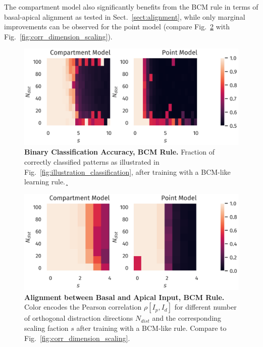 \documentclass[10pt,a4paper,twocolumn]{article}
\begin{document}
		The compartment model also significantly benefits from
		the BCM rule in terms of basal-apical alignment as tested in Sect.~\ref{sect:alignment}, 
		while only marginal
		improvements can be observed for the point model
		(compare Fig.~\ref{fig:corr_dimension_scaling_bcm} 
		with Fig.~\ref{fig:corr_dimension_scaling}).
		
		\begin{figure}
			\includegraphics[width=\columnwidth]{classification_dimension_scaling_bcm_high_input_dim}
			\caption{{\bf Binary Classification Accuracy, BCM Rule.}
				Fraction of correctly classified patterns as illustrated in
				Fig.~\ref{fig:illustration_classification}, after training with
				a BCM-like learning rule.¸}
			\label{fig:classification_accuracy_bcm}
		\end{figure}
		
		\begin{figure}
			\includegraphics[width=\columnwidth]{corr_dimension_scaling_bcm_high_input_dim}
			\caption{{\bf Alignment between Basal and Apical Input, BCM Rule.}
				Color encodes the Pearson correlation $\rho[I_p,I_d]$ for different
				number of orthogonal distraction directions $N_{dist}$ 
				and the corresponding scaling faction $s$ after training
				with a BCM-like rule. Compare to Fig.~\ref{fig:corr_dimension_scaling}.}
			\label{fig:corr_dimension_scaling_bcm}
		\end{figure}
		
\end{document}
